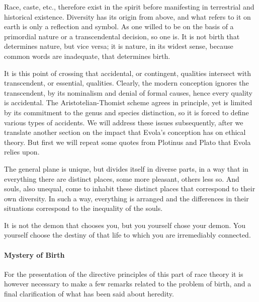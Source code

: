\begin{quotationx}
Race, caste, etc., therefore exist in the spirit before manifesting in terrestrial and historical existence. Diversity has its origin from above, and what refers to it on earth is only a reflection and symbol. As one willed to be on the basis of a primordial nature or a transcendental decision, so one is. It is not birth that determines nature, but vice versa; it is nature, in its widest sense, because common words are inadequate, that determines birth.
\end{quotationx}


It is this point of crossing that accidental, or contingent, qualities intersect with transcendent, or essential, qualities. Clearly, the modern conception ignores the transcendent, by its nominalism and denial of formal causes, hence every quality is accidental. The Aristotelian-Thomist scheme agrees in principle, yet is limited by its commitment to the genus and species distinction, so it is forced to define various types of accidents. We will address these issues subsequently, after we translate another section on the impact that Evola's conception has on ethical theory. But first we will repeat some quotes from Plotinus and Plato that Evola relies upon.

\begin{quotex}
The general plane is unique, but divides itself in diverse parts, in a way that in everything there are distinct places, some more pleasant, others less so. And souls, also unequal, come to inhabit these distinct places that correspond to their own diversity. In such a way, everything is arranged and the differences in their situations correspond to the inequality of the souls.
\end{quotex}


\begin{quotex}
It is not the demon that chooses you, but you yourself chose your demon. You yourself choose the destiny of that life to which you are irremediably connected.
\end{quotex}

\paragraph{Mystery of Birth}


For the presentation of the directive principles of this part of race theory it is however necessary to make a few remarks related to the problem of birth, and a final clarification of what has been said about heredity.

